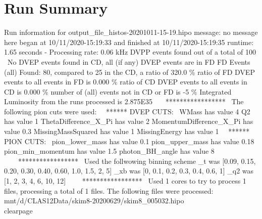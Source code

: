 \documentclass{article}
\begin{document}
\section{Run Summary}

	Run information for output\_file\_histos-20201011-15-19.hipo 
 \Run message: no message here  
 \Script began at 10/11/2020-15:19:33 and finished at 10/11/2020-15:19:35
 \total runtime: 1.65 seconds - Processing rate: 0.06 kHz 
 \No DVPP events found out of a total of 100 
 \ No DVEP events found in CD, all (if any) DVEP events are in FD 
 \Global FD Events (all) Found: 80, compared to 25 in the CD, a ratio of 320.0 \%
 \The ratio of FD DVEP events to all events in FD is  0.000 \%
 \The ratio of CD DVEP events to all events in CD is  0.000 \%
 \The number of (all) events not in CD or FD is  -5 \%
 \Total Integrated Luminosity from the runs processed is 2.875E35 
 \
 \ 
 \
 \****************** 
 \ The following pion cuts were used: 
 \
 \ ****** DVEP CUTS: 
 \ 
 \Cut WMass has value 4 
 \Cut Q2 has value 1 
 \Cut ThetaDifference\_X\_Pi has value 2 
 \Cut MomentumDifference\_X\_Pi has value 0.3 
 \Cut MissingMassSquared has value 1 
 \Cut MissingEnergy has value 1 
 \
 \ ****** PION CUTS: 
 \ 
 \Cut pion\_lower\_mass has value 0.1 
 \Cut pion\_upper\_mass has value 0.18 
 \Cut pion\_min\_momentum has value 1.5 
 \Cut photon\_BH\_angle has value 8 
 \
 \ 
 \ 
 \ ***************** 
 \ Used the follwowing binning scheme 
 \binning\_t was [0.09, 0.15, 0.20, 0.30, 0.40, 0.60, 1.0, 1.5, 2, 5] 
 \binning\_xb was [0, 0.1, 0.2, 0.3, 0.4, 0.6, 1] 
 \binning\_q2 was [1, 2, 3, 4, 6, 10, 12] 
 \
 \ 
 \ 
 \ ***************** 
 \ Used 1 cores to try to process 1 files, processing a total of 1 files. The following files were processed: 
 \/mnt/d/CLAS12Data/skim8-20200629/skim8\_005032.hipo 
 \\clearpage 
\listoffigures
\clearpage
\end{document}
